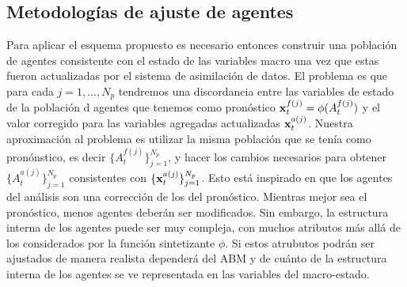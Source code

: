 \subsection{Metodologías de ajuste de agentes}

Para aplicar el esquema propuesto es necesario entonces construir una población de agentes consistente con el estado de las variables macro una vez que estas fueron actualizadas por el sistema de asimilación de datos. El problema es que para cada $j = 1, ..., N_p$ tendremos una discordancia entre las variables de estado de la población d agentes que tenemos como pronóstico $\mathbf{x}_t^{f(j)} = \phi (A_t^{f(j)})$ y el valor corregido para las variables agregadas actualizadas $\mathbf{x}_t^{a(j)}$. Nuestra aproximación al problema es utilizar la misma población que se tenía como pronónstico, es decir $\{A_t^{f(j)}\}_{j=1}^{N_p}$, y hacer los cambios necesarios para obtener $\{A_t^{a(j)}\}_{j=1}^{N_p}$ consistentes con $\{\mathbf{x}_t^{a(j)}\}_{j=1}^{N_p}$. Esto está inspirado en que los agentes del análisis son una corrección de los del pronóstico. Mientras mejor sea el pronóstico, menos agentes deberán ser modificados. Sin embargo, la estructura interna de los agentes puede ser muy compleja, con muchos atributos más allá de los considerados por la función sintetizante $\phi$. Si estos atrubutos podrán ser ajustados de manera realista dependerá del ABM y de cuánto de la estructura interna de los agentes se ve representada en las variables del macro-estado.

